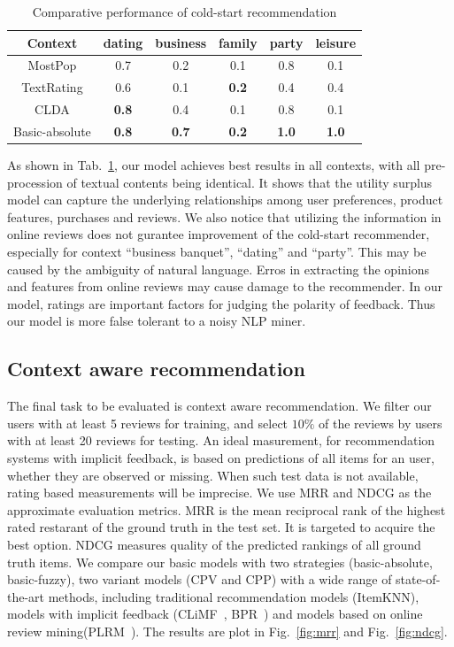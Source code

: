 \documentclass[sigconf]{acmart}
\begin{document}
\begin{table}\label{tab:p10}
	\centering
	\caption{Comparative performance of cold-start recommendation}
		\begin{tabular}{|c|c|c|c|c|c|}	
		\hline
Context	&			dating	&business	&family&	party	&leisure\\\hline\hline
MostPop&	0.7&	0.2	&0.1&0.8	&0.1\\\hline
TextRating	&0.6	&0.1	&\textbf{0.2}&	0.4	&0.4\\\hline
CLDA	&\textbf{0.8}	&0.4&	0.1	&0.8&	0.1\\\hline
Basic-absolute	&\textbf{0.8}	&\textbf{0.7}&	\textbf{0.2}&	\textbf{1.0}&	\textbf{1.0}\\\hline
		\end{tabular}
\end{table}

As shown in Tab.~\ref{tab:p10}, our model achieves best results in all contexts, with all pre-procession of textual contents being identical. It shows that the utility surplus model can capture the underlying relationships among user preferences, product features, purchases and reviews. We also notice that utilizing the information in online reviews does not gurantee improvement of the cold-start recommender, especially for context ``business banquet'', ``dating'' and ``party''. This may be caused by the ambiguity of natural language. Erros in extracting the opinions and features from online reviews may cause damage to the recommender. In our model, ratings are important factors for judging the polarity of feedback. Thus our model is more false tolerant to a noisy NLP miner.  

\subsection{Context aware recommendation}
The final task to be evaluated is context aware recommendation. We filter our users with at least 5 reviews for training, and select $10\%$ of the reviews by users with at least 20 reviews for testing. An ideal masurement, for recommendation systems with implicit feedback, is based on predictions of all items for an user, whether they are observed or missing. When such test data is not available, rating based measurements will be imprecise. We use MRR and NDCG as the approximate evaluation metrics. MRR is the mean reciprocal rank of the highest rated restarant of the ground truth in the test set. It is targeted to acquire the best option. NDCG measures quality of the predicted rankings of all ground truth items. We compare our basic models with two strategies (basic-absolute, basic-fuzzy), two variant models (CPV and CPP) with a wide range of state-of-the-art methods, including traditional recommendation models (ItemKNN), models with implicit feedback (CLiMF~\cite{Shi2012CLiMF}, BPR~\cite{Rendle2009BPR}) and models based on online review mining(PLRM~\cite{Li2010Contextual}). The results are plot in Fig.~\ref{fig:mrr} and Fig.~\ref{fig:ndcg}. 
\end{document}

